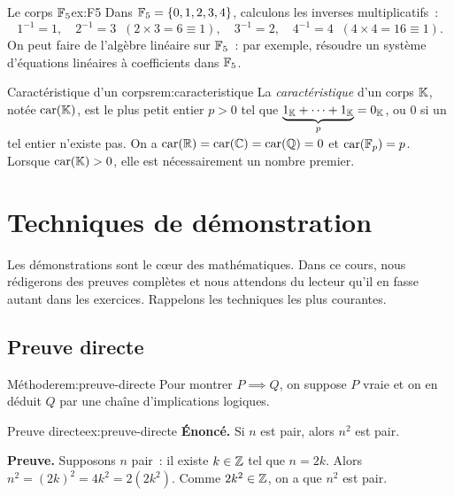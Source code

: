 \begin{example}{Le corps ${\mathbb{F}}_5$}{ex:F5}
  Dans ${\mathbb{F}}_5=\left\{0,1,2,3,4\right\}$, calculons les inverses multiplicatifs~:
  \[
    1^{-1}=1,\quad 2^{-1}=3\;\;(2\times 3=6\equiv 1),\quad
    3^{-1}=2,\quad 4^{-1}=4\;\;(4\times 4=16\equiv 1).
  \]
  On peut faire de l'algèbre linéaire sur ${\mathbb{F}}_5$~: par exemple, résoudre
  un système d'équations linéaires à coefficients dans ${\mathbb{F}}_5$.
\end{example}

\begin{remark}{Caractéristique d'un corps}{rem:caracteristique}
  La \emph{caractéristique} d'un corps ${\mathbb{K}}$,
  notée $\operatorname{car}({\mathbb{K}})$, est le plus petit entier $p>0$ tel que
  $\underbrace{1_{\mathbb{K}}+\cdots+1_{\mathbb{K}}}_{p}=0_{\mathbb{K}}$, ou $0$ si un tel entier
  n'existe pas. On a $\operatorname{car}({\mathbb{R}})=\operatorname{car}({\mathbb{C}})=\operatorname{car}({\mathbb{Q}})=0$ et $\operatorname{car}({\mathbb{F}}_p)=p$.
  Lorsque $\operatorname{car}({\mathbb{K}})>0$, elle est nécessairement un nombre premier.
\end{remark}

\section{Techniques de démonstration}\label{sec:demonstrations}

Les démonstrations sont le c\oe{}ur des mathématiques. Dans ce cours,
nous rédigerons des preuves complètes et nous attendons du lecteur qu'il
en fasse autant dans les exercices. Rappelons les techniques les plus
courantes.

\subsection{Preuve directe}\label{subsec:preuve-directe}

\begin{remark}{Méthode}{rem:preuve-directe}
  Pour montrer $P\implies Q$, on suppose $P$ vraie et on en déduit $Q$
  par une chaîne d'implications logiques.
\end{remark}

\begin{example}{Preuve directe}{ex:preuve-directe}
  \textbf{Énoncé.} Si $n$ est pair, alors $n^2$ est pair.

  \textbf{Preuve.} Supposons $n$ pair~: il existe $k\in{\mathbb{Z}}$ tel que $n=2k$.
  Alors $n^2=(2k)^2=4k^2=2(2k^2)$. Comme $2k^2\in{\mathbb{Z}}$, on a que $n^2$ est
  pair.
\end{example}

